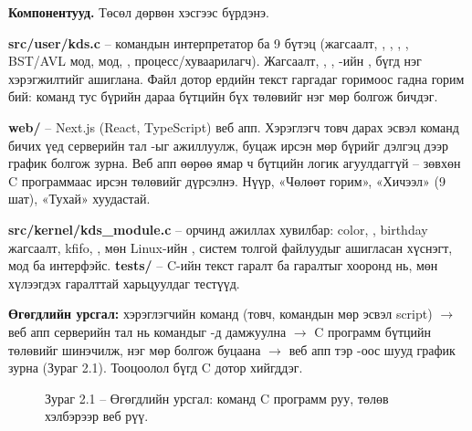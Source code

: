 \textbf{Компонентууд.} Төсөл дөрвөн хэсгээс бүрдэнэ.

\textbf{src/user/kds.c} -- командын интерпретатор ба 9 бүтэц (жагсаалт, , , , , BST/AVL мод,  мод, , процесс/хуваарилагч). Жагсаалт, , , -ийн ,  бүгд нэг  хэрэгжилтийг ашиглана. Файл дотор ердийн текст гаргадаг горимоос гадна  горим бий: команд тус бүрийн дараа бүтцийн бүх төлөвийг нэг  мөр болгож бичдэг.

\textbf{web/} -- Next.js (React, TypeScript) веб апп. Хэрэглэгч товч дарах эсвэл команд бичих үед серверийн тал -ыг ажиллуулж, буцаж ирсэн  мөр бүрийг дэлгэц дээр график болгож зурна. Веб апп өөрөө ямар ч бүтцийн логик агуулдаггүй -- зөвхөн C программаас ирсэн төлөвийг дүрсэлнэ. Нүүр, «Чөлөөт горим», «Хичээл» (9 шат), «Тухай» хуудастай.

\textbf{src/kernel/kds\_module.c} --  орчинд ажиллах хувилбар: color, , birthday жагсаалт, kfifo, , мөн Linux-ийн ,  систем толгой файлуудыг ашигласан  хүснэгт,  мод ба  интерфэйс. \textbf{tests/} -- C-ийн текст гаралт ба  гаралтыг хооронд нь, мөн хүлээгдэх гаралттай харьцуулдаг тестүүд.

\textbf{Өгөгдлийн урсгал:} хэрэглэгчийн команд (товч, командын мөр эсвэл script) $\rightarrow$ веб апп серверийн тал нь командыг -д дамжуулна $\rightarrow$ C программ бүтцийн төлөвийг шинэчилж, нэг  мөр болгож буцаана $\rightarrow$ веб апп тэр -оос шууд график зурна (Зураг 2.1). Тооцоолол бүгд C дотор хийгддэг.

\begin{figure}[H]
\centering
{}
\caption*{Зураг 2.1 -- Өгөгдлийн урсгал: команд C программ руу, төлөв  хэлбэрээр веб рүү.}
\end{figure}


